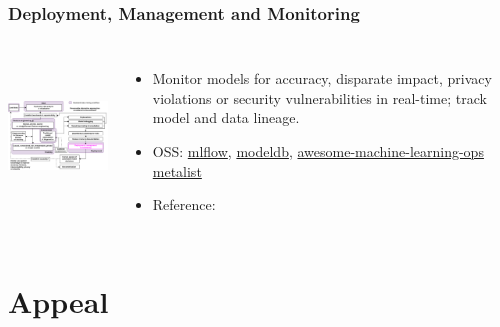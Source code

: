 \documentclass[11pt,
               aspectratio=169,
               hyperref={colorlinks}
               ]{beamer}
\begin{document}
		\begin{frame}

			\frametitle{Deployment, Management and Monitoring}		
			
			\begin{columns}
	
				\centering
				\includegraphics[height=120pt]{img/deploy.png}
				
				\vspace{-5pt}
				\begin{itemize}
					\item Monitor models for accuracy, disparate impact, privacy violations or security vulnerabilities in real-time; track model and data lineage.
					\item OSS: \href{https://github.com/mlflow/mlflow}{mlflow}, \href{https://github.com/mitdbg/modeldb}{modeldb}, \href{https://github.com/EthicalML/awesome-machine-learning-operations}{awesome-machine-learning-ops metalist}
					\item Reference: 
				\end{itemize}
				
			\end{columns}
		
		\end{frame}

	\section{Appeal}
\end{document}
